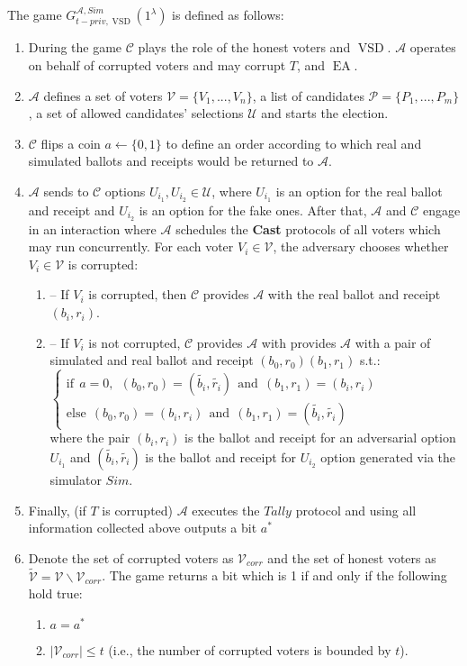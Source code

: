 \documentclass[12pt]{article}
\DeclareMathOperator{\vsd}{VSD}
\DeclareMathOperator{\ea}{EA}
\begin{document}
The game $G_{t-priv, \vsd}^{\mathcal{A},Sim}(1^{\lambda})$ is defined as follows:
\begin{enumerate}
\item During the game $\mathcal{C}$ plays the role of the honest voters and $\vsd$. $\mathcal{A}$ operates on behalf of corrupted voters and may corrupt $T$, and $\ea$. 
\item $\mathcal{A}$ defines a set of voters  $\mathcal{V} = \{V_1,...,V_n\}$, a list of candidates  $\mathcal{P} = \{P_1,...,P_m\}$, a set of allowed candidates' selections $\mathcal{U}$ and  starts the election.
\item $\mathcal{C}$ flips a coin $a \leftarrow \{0,1\}$ to define an order according to which real and simulated ballots and receipts would be returned to $\mathcal{A}$.
\item   $\mathcal{A}$ sends to  $\mathcal{C}$ options $U_{i_1}, U_{i_2} \in  \mathcal{U}$, where $U_{i_1}$ is an option for the real ballot and receipt and $U_{i_2}$ is an option for the fake ones.  After that, $\mathcal{A}$ and $\mathcal{C}$ engage in an interaction where $\mathcal{A}$ schedules the \textbf{Cast}   protocols of all voters which may run concurrently. For each voter $V_i \in \mathcal{V}$, the adversary chooses whether $V_i \in \mathcal{V}$ is corrupted: 
\begin{enumerate}
\item[] -- If $V_i$ is corrupted, then $\mathcal{C}$ provides $\mathcal{A}$ with the real ballot and receipt $(b_i,r_i)$.
\item[] --  If $V_i$ is not corrupted, $\mathcal{C}$  provides $\mathcal{A}$ with   provides $\mathcal{A}$ with a pair of simulated and real ballot and receipt $(b_0, r_0) (b_1, r_1)$ s.t.:\\
$ \begin{cases}
 \text{if} ~~a =0,~~ (b_0,r_0) = (\tilde{b_i},\tilde{r_i}) ~~ \text{and} ~~  (b_1,r_1) = (b_i,r_i)   \\ 
 \text{else}~~ (b_0,r_0) =(b_i,r_i)~~  \text{and} ~~  (b_1,r_1) =(\tilde{b_i},\tilde{r_i})
\end{cases}$\\ 
where the pair $(b_i, r_i)$ is the ballot and receipt for an adversarial option $U_{i_1}$ and $(\tilde{b_i},\tilde{r_i})$ is the ballot and receipt for  $U_{i_2}$ option generated via the simulator $Sim$.
\end{enumerate}
\item Finally, (if $T$ is corrupted) $\mathcal{A}$  executes the $Tally$ protocol  and using all information collected above outputs a bit $a^*$
\item Denote the set of corrupted voters as $\mathcal{V}_{corr}$ and the set of honest voters as $\tilde{\mathcal{V}}= \mathcal{V} \backslash \mathcal{V}_{corr}$. The game returns a bit which is 1 if and only if the following hold true:
\begin{enumerate}
 \item $a = a^*$
 \item $|\mathcal{V}_{corr}| \leq t$ (i.e., the number of corrupted voters is bounded by $t$).
\end{enumerate}
\end{enumerate}
\end{document}
